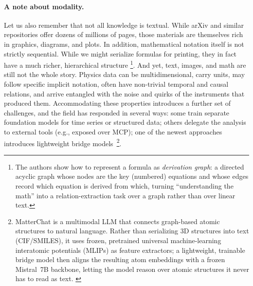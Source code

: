 \paragraph{A note about modality.}
Let us also remember that not all knowledge is textual. While arXiv and similar repositories offer dozens of millions of pages, those materials are themselves rich in graphics, diagrams, and plots. In addition, mathematical notation itself is not strictly sequential. While we might serialize formulas for printing, they in fact have a much richer, hierarchical structure \cite{2410.21324}\footnote{%
    The authors show how to represent a formula as \emph{derivation graph}: a directed acyclic graph whose nodes are the key (numbered) equations and whose edges record which equation is derived from which, turning ``understanding the math'' into a relation-extraction task over a graph rather than over linear text.
}.
And yet, text, images, and math are still not the whole story. Physics data can be multidimensional, carry units, may follow specific implicit notation, often have non-trivial temporal and causal relations, and arrive entangled with the noise and quirks of the instruments that produced them.
Accommodating these properties introduces a further set of challenges, and the field has responded in several ways: some train separate foundation models for time series or structured data; others delegate the analysis to external tools (e.g., exposed over MCP); one of the newest approaches introduces lightweight bridge models~\cite{Tang2026}\footnote{%
    MatterChat is a multimodal LLM that connects graph-based atomic structures to natural language. Rather than serializing 3D structures into text (CIF/SMILES), it uses frozen, pretrained universal machine-learning interatomic potentials (MLIPs) as feature extractors; a lightweight, trainable bridge model then aligns the resulting atom embeddings with a frozen Mistral~7B backbone, letting the model reason over atomic structures it never has to read as text.
    \label{footnote:MatterChat}
}.

